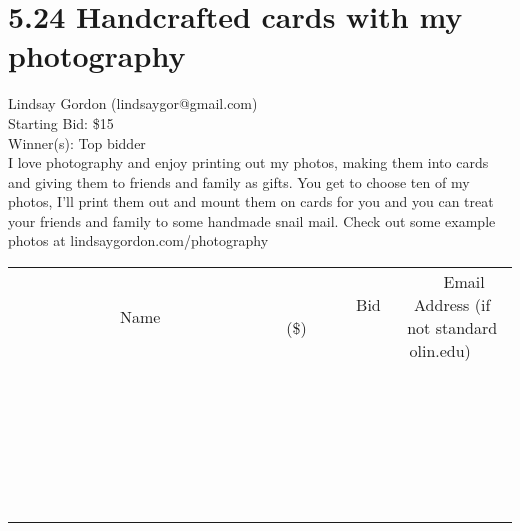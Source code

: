 \documentclass[11pt]{article}
\begin{document}
\section*{5.24 Handcrafted cards with my photography}
Lindsay Gordon (lindsaygor@gmail.com) \\
Starting Bid: \$15 \\
Winner(s): 
Top bidder \\
I love photography and enjoy printing out my photos, making them into cards and giving them to friends and family as gifts. You get to choose ten of my photos, I'll print them out and mount them on cards for you and you can treat your friends and family to some handmade snail mail. Check out some example photos at lindsaygordon.com/photography \\[6ex]
\begin{tabular}{c c c}
~~~~~~~~~~~~~Name~~~~~~~~~~~~~ & ~~~~~~~~~Bid (\$)~~~~~~~~~ & ~~~Email Address (if not standard olin.edu)~~~ \\
 & & \\
\hline
 & & \\
\hline
 & & \\
\hline
 & & \\
\hline
 & & \\
\hline
 & & \\
\hline
 & & \\
\hline
 & & \\
\hline
 & & \\
\hline
 & & \\
\hline
 & & \\
\hline
 & & \\
\hline
 & & \\
\hline
 & & \\
\hline
 & & \\
\hline
 & & \\
\hline
 & & \\
\hline
 & & \\
\hline
 & & \\
\hline
 & & \\
\hline
 & & \\
\hline
 & & \\
\hline
 & & \\
\hline
 & & \\
\hline
 & & \\
\hline
 & & \\
\hline
\end{tabular}
\clearpage
\end{document}

